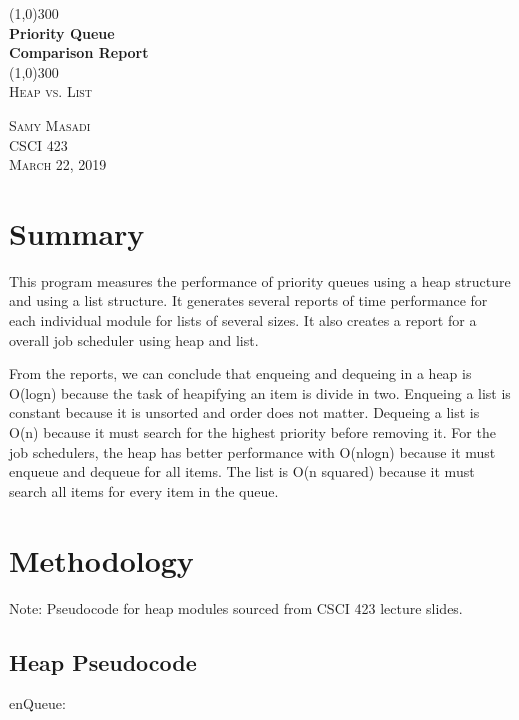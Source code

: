 \documentclass{article}
\begin{document}
\begin{titlepage}
    \begin{center}
    \line(1,0){300} \\
    [0.2in]
    \huge{\bfseries Priority Queue\\ Comparison Report} \\
    \line(1,0){300} \\
    [1.5cm]
    \textsc{\LARGE Heap vs. List}\\
    [15cm]
    \end{center}
    \begin{flushright}
    \textsc{\large Samy Masadi\\
    CSCI 423\\
    March 22, 2019}
    \end{flushright}
\end{titlepage}

\tableofcontents
\thispagestyle{empty}
\cleardoublepage

\setcounter{page}{1}

\section{Summary}
This program measures the performance of priority queues using a heap structure and using a list structure. It generates several reports of time performance for each individual module for lists of several sizes. It also creates a report for a overall job scheduler using heap and list.

From the reports, we can conclude that enqueing and dequeing in a heap is O(logn) because the task of heapifying an item is divide in two. Enqueing a list is constant because it is unsorted and order does not matter. Dequeing a list is O(n) because it must search for the highest priority before removing it. For the job schedulers, the heap has better performance with O(nlogn) because it must enqueue and dequeue for all items. The list is O(n squared) because it must search all items for every item in the queue.

\newpage
\section{Methodology}
Note: Pseudocode for heap modules sourced from CSCI 423 lecture slides.
\subsection{Heap Pseudocode}
\hspace{\parindent}enQueue:
\end{document}
